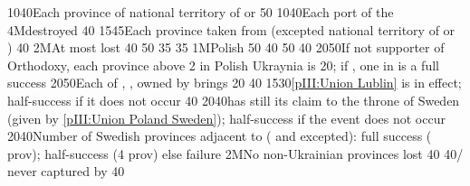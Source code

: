 {10}{40}{Each province of national territory of \paysgeorgie or \paysperse}%
%
%
{}{50}{}%
%
%
{10}{40}{Each port of the \regionBaltique}%
%
\EUobjective4M{\payscrimee destroyed}{}%
{}{40}{}%
%
%
{15}{45}{Each province taken from \paysmajeurTurquie (excepted national
  territory of \paysgeorgie or \paysperse)}%
%
 
%
%
{}{40}{}%
%
\EUobjective2M{At most \provinceSmolenska lost}{}%
{}{40}{}%
%
%
{}{50}{}%
%
%
{}{35}{}%
%
%
{}{35}{}%
%
%
\EUobjective1M{Polish \provinceSmolenska}{}%
{}{50}{}%
%
%
{}{40}{}%
%
%
{}{50}{}%
%
%
{}{40}{}%
%
%
{20}{50}{If not supporter of Orthodoxy, each province above 2 in Polish
  Ukraynia is 20\VPs; if \Xorthodoxe, one \COL in \continentSiberia is a full
  success}%
%
%
%
{20}{50}{Each of \provinceKurland, \provinceMemel, \provincePreussen owned by
  \paysmajeurPologne brings 20\VPs}%
%
%
{}{40}{}%
%
%
{15}{30}{\ref{pIII:Union Lublin} is in effect; half-success if it does not
  occur}%
%
%
{}{40}{}%
%
%
{20}{40}{\POL has still its claim to the throne of Sweden (given by
  \ref{pIII:Union Poland Sweden}); half-success if the event does not occur}%
%
%
%
{20}{40}{Number of Swedish provinces adjacent to \regionBaltique (\regionSuede
  and \regionFinlande excepted): full success ( prov);
  half-success (4 prov) else failure}%
%
\EUobjective2M{No non-Ukrainian provinces lost}{}%
{}{40}{}%
%
%
{}{40}{\provinceOsterreich/ never captured by
  }%
%
%
{}{40}{}%
%

